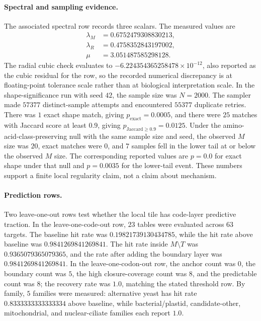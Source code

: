 \paragraph{Spectral and sampling evidence.}
The associated spectral row records three scalars. The measured values are
$$
\begin{aligned}
\lambda_M&=0.6752479308830213,\\
\lambda_R&=0.4758352843197002,\\
\mu&=3.051487585298128.
\end{aligned}
$$
The radial cubic check evaluates to $-6.224354365258478\times 10^{-12}$, also reported as the cubic residual for the row, so the recorded numerical discrepancy is at floating-point tolerance scale rather than at biological interpretation scale. In the shape-significance run with seed $42$, the sample size was $N=2000$. The sampler made $57377$ distinct-sample attempts and encountered $55377$ duplicate retries. There was $1$ exact shape match, giving $p_{\mathrm{exact}}=0.0005$, and there were $25$ matches with Jaccard score at least $0.9$, giving $p_{\mathrm{Jaccard}\ge 0.9}=0.0125$. Under the amino-acid-class-preserving null with the same sample size and seed, the observed $M$ size was $20$, exact matches were $0$, and $7$ samples fell in the lower tail at or below the observed $M$ size. The corresponding reported values are $p=0.0$ for exact shape under that null and $p=0.0035$ for the lower-tail event. These numbers support a finite local regularity claim, not a claim about mechanism.

\paragraph{Prediction rows.}
Two leave-one-out rows test whether the local tile has code-layer predictive traction. In the leave-one-code-out row, $23$ tables were evaluated across $63$ targets. The baseline hit rate was $0.19821739130434785$, while the hit rate above baseline was $0.9841269841269841$. The hit rate inside $M\setminus T$ was $0.9365079365079365$, and the rate after adding the boundary layer was $0.9841269841269841$. In the leave-one-codon-out row, the anchor count was $0$, the boundary count was $5$, the high closure-coverage count was $8$, and the predictable count was $8$; the recovery rate was $1.0$, matching the stated threshold row. By family, $5$ families were measured: alternative yeast has hit rate $0.8333333333333334$ above baseline, while bacterial/plastid, candidate-other, mitochondrial, and nuclear-ciliate families each report $1.0$.

